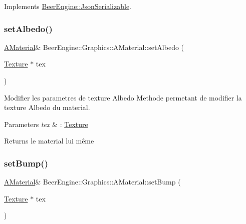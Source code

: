 Implements \mbox{\hyperlink{class_beer_engine_1_1_json_serializable_a17689cbd8fe282c570bd026cc1be5b3b}{Beer\+Engine\+::\+Json\+Serializable}}.

\mbox{\label{class_beer_engine_1_1_graphics_1_1_a_material_a2b891be27dfdc7ebad90ea529786d126}} 
\subsubsection{\texorpdfstring{set\+Albedo()}{setAlbedo()}}
{\footnotesize\ttfamily \mbox{\hyperlink{class_beer_engine_1_1_graphics_1_1_a_material}{A\+Material}}\& Beer\+Engine\+::\+Graphics\+::\+A\+Material\+::set\+Albedo (\begin{DoxyParamCaption}\item[{\mbox{\hyperlink{class_beer_engine_1_1_graphics_1_1_texture}{Texture}} $\ast$}]{tex }\end{DoxyParamCaption})}



Modifier les parametres de texture Albedo Methode permetant de modifier la texture Albedo du material. 


\begin{DoxyParams}{Parameters}
{\em tex} & \+: \mbox{\hyperlink{class_beer_engine_1_1_graphics_1_1_texture}{Texture}} \\
\hline
\end{DoxyParams}
\begin{DoxyReturn}{Returns}
le material lui même 
\end{DoxyReturn}
\mbox{\label{class_beer_engine_1_1_graphics_1_1_a_material_a88a94faaf480849b803302a864b30e7e}} 
\subsubsection{\texorpdfstring{set\+Bump()}{setBump()}}
{\footnotesize\ttfamily \mbox{\hyperlink{class_beer_engine_1_1_graphics_1_1_a_material}{A\+Material}}\& Beer\+Engine\+::\+Graphics\+::\+A\+Material\+::set\+Bump (\begin{DoxyParamCaption}\item[{\mbox{\hyperlink{class_beer_engine_1_1_graphics_1_1_texture}{Texture}} $\ast$}]{tex }\end{DoxyParamCaption})}



